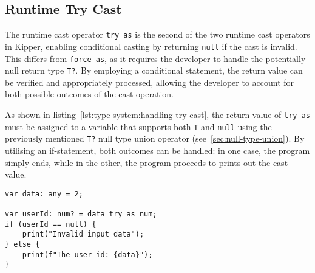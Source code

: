 \subsection{Runtime Try Cast}

The runtime cast operator \lstinline|try as| is the second of the two runtime cast operators in Kipper, enabling conditional casting by returning \lstinline|null| if the cast is invalid. This differs from \lstinline|force as|, as it requires the developer to handle the potentially null return type \lstinline|T?|. By employing a conditional statement, the return value can be verified and appropriately processed, allowing the developer to account for both possible outcomes of the cast operation.

As shown in listing~\ref{lst:type-system:handling-try-cast}, the return value of \lstinline|try as| must be assigned to a variable that supports both \lstinline|T| and \lstinline|null| using the previously mentioned \lstinline|T?| null type union operator (see~\ref{sec:null-type-union}). By utilising an if-statement, both outcomes can be handled: in one case, the program simply ends, while in the other, the program proceeds to prints out the cast value.

\begin{lstlisting}[language=Kipper,caption=Casting an \lstinline|any| type value using the \lstinline|try as| cast operator and handling both possible outcomes,label=lst:type-system:handling-try-cast]
var data: any = 2;

var userId: num? = data try as num; 
if (userId == null) {
	print("Invalid input data");
} else {
	print(f"The user id: {data}");
}
\end{lstlisting}

